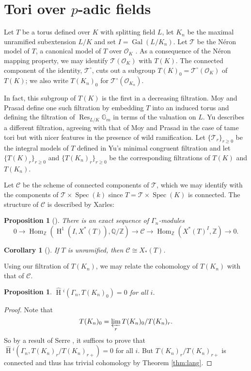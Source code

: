 \documentclass{compositio}
\theoremstyle{plain}
\newtheorem{proposition}[theorem]{Proposition}
\newtheorem{corollary}[theorem]{Corollary}
\newcommand{\HT}[1]{\hat{\HH}{}^{#1}}
\theoremstyle{definition}
\DeclareMathOperator{\Gal}{Gal}
\DeclareMathOperator{\HH}{H}
\DeclareMathOperator{\Hom}{Hom}
\DeclareMathOperator{\Spec}{Spec}
\DeclareMathOperator{\Res}{Res}
\newcommand{\TT}{\mathcal{T}}
\newcommand{\C}{\mathcal{C}}
\newcommand{\OK}{\mathcal{O}_K}
\newcommand{\OKn}{\mathcal{O}_{K_n}}
\newcommand{\ZZ}{\mathbb{Z}}
\newcommand{\QQ}{\mathbb{Q}}
\newcommand{\Gm}{\mathbb{G}_m}
\newcommand{\invlim}[1]{\varprojlim_{#1}}
\begin{document}
\section{Tori over $p$-adic fields} \label{section:padic_tori}

Let $T$ be a torus defined over $K$ with splitting field $L$, let $K_n$ be the maximal
unramified subextension $L/K$ and set $I = \Gal(L/K_n)$.
Let $\TT$ be the N\'eron model of $T$, a canonical model of $T$
over $\OK$ \cite[Ch. 10]{bosch-lutkebohmert-reynaud:NeronModels}.
As a consequence of the N\'eron mapping
property, we may identify $\TT(\OK)$ with $T(K)$.  The connected
component of the identity, $\TT^\circ$, cuts out a subgroup
$T(K)_0 = \TT^\circ(\OK)$ of $T(K)$; we also write $T(K_n)_0$ for
$\TT^\circ(\OKn)$.

In fact, this subgroup of $T(K)$ is the first in a decreasing filtration.
Moy and Prasad \cite{moy-prasad:96a}
define one such filtration by
embedding $T$ into an induced torus and defining the filtration of
$\Res_{L/K} \Gm$ in terms of the valuation on $L$.  Yu \cite[\S 5]{yu:03a}
describes a different filtration, agreeing with that of Moy and Prasad
in the case of tame tori but with nicer features in the presence of wild
ramification.  Let $\{\TT_r\}_{r \ge 0}$ be the integral models of $T$ defined in Yu's
minimal congruent filtration and let $\{T(K)_r\}_{r \ge 0}$ and
$\{T(K_n)_r\}_{r \ge 0}$ be the corresponding filtrations of $T(K)$ and
$T(K_n)$.

Let $\C$ be the scheme of
connected components of $\TT$,
which we may identify with the
components of $\TT \times \Spec(k)$ since $T = \TT \times \Spec(K)$
is connected.  The structure of $\C$ is described by Xarles:

\begin{proposition}[{\cite[Cor. 2.12]{xarles:93a}}]
There is an exact sequence of $\Gamma_n$-modules
$$0 \rightarrow \Hom_{\ZZ}(\HH^1(I, X^*(T)), \QQ/\ZZ) \rightarrow
\C \rightarrow \Hom_{\ZZ}(X^*(T)^I, \ZZ) \rightarrow 0.$$
\end{proposition}

\begin{corollary}[{\cite[Thm. 1.1]{xarles:93a}}] \label{cor:unram_components}
If $T$ is unramified, then $\C \cong X_*(T)$.
\end{corollary}

Using our filtration of $T(K_n)$, we may relate the cohomology of $T(K_n)$
with that of $\C$.

\begin{proposition}\label{prop:T0_cohom_triv}
$\HT{i}(\Gamma_n, T(K_n)_0) = 0$ for all $i$.
\end{proposition}
\begin{proof}
Note that
$$T(K_n)_0 = \invlim{r} T(K_n)_0 / T(K_n)_r.$$
So by a result of Serre \cite[Lem. 3]{serre:LocalClassFieldThy}, it suffices to prove that
\\ $\HT{i}(\Gamma_n, T(K_n)_r / T(K_n)_{r+}) = 0$ for all $i$.  But $T(K_n)_r / T(K_n)_{r+}$
is connected \cite[Prop. 5.2]{yu:03a} and thus has trivial cohomology by
Theorem \ref{thm:lang}.
\end{proof}
\end{document}
